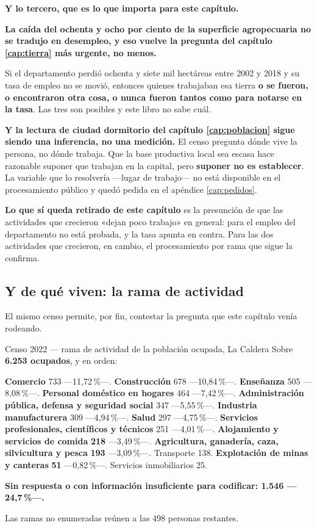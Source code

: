 \textbf{Y lo tercero, que es lo que importa para este capítulo.}

\begin{cautela}
\textbf{La caída del ochenta y ocho por ciento de la superficie agropecuaria no se tradujo en
desempleo, y eso vuelve la pregunta del capítulo \ref{cap:tierra} más urgente, no menos.}

Si el departamento perdió ochenta y siete mil hectáreas entre 2002 y 2018 y su tasa de empleo
no se movió, entonces quienes trabajaban esa tierra \textbf{o se fueron, o encontraron otra
cosa, o nunca fueron tantos como para notarse en la tasa}. Las tres son posibles y este libro
no sabe cuál.

\textbf{Y la lectura de ciudad dormitorio del capítulo \ref{cap:poblacion} sigue siendo una
inferencia, no una medición.} El censo pregunta dónde vive la persona, no dónde trabaja. Que la
base productiva local sea escasa hace razonable suponer que trabajan en la capital, pero
\textbf{suponer no es establecer}. La variable que lo resolvería ---lugar de trabajo--- no está
disponible en el procesamiento público y quedó pedida en el apéndice \ref{cap:pedidos}.

\textbf{Lo que sí queda retirado de este capítulo} es la presunción de que las actividades que
crecieron «dejan poco trabajo» en general: para el empleo del departamento no está probada, y la tasa apunta en contra. Para las dos actividades que crecieron, en cambio, el procesamiento por rama que sigue la confirma.
\end{cautela}

\subsection*{Y de qué viven: la rama de actividad}

El mismo censo permite, por fin, contestar la pregunta que este capítulo venía rodeando.

\begin{ficha}{Censo 2022 --- rama de actividad de la población ocupada, La Caldera}
Sobre \textbf{6.253 ocupados}, y en orden:

\textbf{Comercio} 733 ---11,72\,\%---. \textbf{Construcción} 678 ---10,84\,\%---.
\textbf{Enseñanza} 505 ---8,08\,\%---. \textbf{Personal doméstico en hogares} 464
---7,42\,\%---. \textbf{Administración pública, defensa y seguridad social} 347 ---5,55\,\%---.
\textbf{Industria manufacturera} 309 ---4,94\,\%---. \textbf{Salud} 297 ---4,75\,\%---.
\textbf{Servicios profesionales, científicos y técnicos} 251 ---4,01\,\%---.
\textbf{Alojamiento y servicios de comida} \textbf{218} ---3,49\,\%---.
\textbf{Agricultura, ganadería, caza, silvicultura y pesca} \textbf{193} ---3,09\,\%---.
Transporte 138. \textbf{Explotación de minas y canteras} \textbf{51} ---0,82\,\%---.
Servicios inmobiliarios 25.

\textbf{Sin respuesta o con información insuficiente para codificar: 1.546 ---24,7\,\%---.}

Las ramas no enumeradas reúnen a las 498 personas restantes.
\end{ficha}

